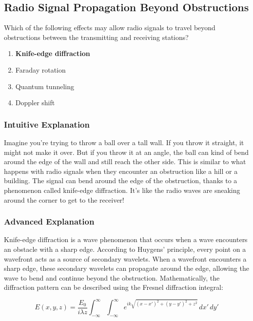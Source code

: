 \subsection{Radio Signal Propagation Beyond Obstructions}
\label{T3C05}

\begin{tcolorbox}[colback=gray!10!white,colframe=black!75!black,title=T3C05]
Which of the following effects may allow radio signals to travel beyond obstructions between the transmitting and receiving stations?
\begin{enumerate}[label=\Alph*)]
    \item \textbf{Knife-edge diffraction}
    \item Faraday rotation
    \item Quantum tunneling
    \item Doppler shift
\end{enumerate}
\end{tcolorbox}

\subsubsection{Intuitive Explanation}
Imagine you're trying to throw a ball over a tall wall. If you throw it straight, it might not make it over. But if you throw it at an angle, the ball can kind of bend around the edge of the wall and still reach the other side. This is similar to what happens with radio signals when they encounter an obstruction like a hill or a building. The signal can bend around the edge of the obstruction, thanks to a phenomenon called knife-edge diffraction. It's like the radio waves are sneaking around the corner to get to the receiver!

\subsubsection{Advanced Explanation}
Knife-edge diffraction is a wave phenomenon that occurs when a wave encounters an obstacle with a sharp edge. According to Huygens' principle, every point on a wavefront acts as a source of secondary wavelets. When a wavefront encounters a sharp edge, these secondary wavelets can propagate around the edge, allowing the wave to bend and continue beyond the obstruction. Mathematically, the diffraction pattern can be described using the Fresnel diffraction integral:

\[
E(x, y, z) = \frac{E_0}{i\lambda z} \int_{-\infty}^{\infty} \int_{-\infty}^{\infty} e^{ik\sqrt{(x-x')^2 + (y-y')^2 + z^2}} \, dx' \, dy'
\]

